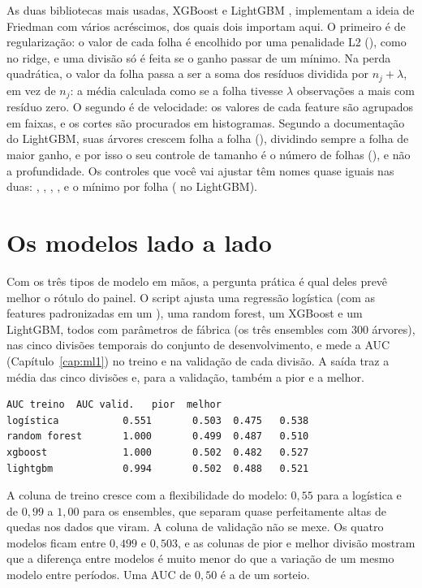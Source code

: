 As duas bibliotecas mais usadas, XGBoost \citep{chen2016} e LightGBM \citep{ke2017}, implementam a ideia de Friedman com vários acréscimos, dos quais dois importam aqui. O primeiro é de regularização: o valor de cada folha é encolhido por uma penalidade L2 (), como no ridge, e uma divisão só é feita se o ganho passar de um mínimo. Na perda quadrática, o valor da folha passa a ser a soma dos resíduos dividida por $n_j + \lambda$, em vez de $n_j$: a média calculada como se a folha tivesse $\lambda$ observações a mais com resíduo zero. O segundo é de velocidade: os valores de cada feature são agrupados em faixas, e os cortes são procurados em histogramas. Segundo a documentação do LightGBM, suas árvores crescem folha a folha (), dividindo sempre a folha de maior ganho, e por isso o seu controle de tamanho é o número de folhas (), e não a profundidade. Os controles que você vai ajustar têm nomes quase iguais nas duas: , , , ,  e o mínimo por folha ( no LightGBM).

\section{Os modelos lado a lado}
\label{sec:c13-comparacao}

Com os três tipos de modelo em mãos, a pergunta prática é qual deles prevê melhor o rótulo do painel. O script  ajusta uma regressão logística (com as features padronizadas em um ), uma random forest, um XGBoost e um LightGBM, todos com parâmetros de fábrica (os três ensembles com 300 árvores), nas cinco divisões temporais do conjunto de desenvolvimento, e mede a AUC (Capítulo~\ref{cap:ml1}) no treino e na validação de cada divisão. A saída traz a média das cinco divisões e, para a validação, também a pior e a melhor.

\begin{lstlisting}[style=saida]
               AUC treino  AUC valid.   pior  melhor
logística           0.551       0.503  0.475   0.538
random forest       1.000       0.499  0.487   0.510
xgboost             1.000       0.502  0.482   0.527
lightgbm            0.994       0.502  0.488   0.521
\end{lstlisting}

A coluna de treino cresce com a flexibilidade do modelo: $0,55$ para a logística e de $0,99$ a $1,00$ para os ensembles, que separam quase perfeitamente altas de quedas nos dados que viram. A coluna de validação não se mexe. Os quatro modelos ficam entre $0,499$ e $0,503$, e as colunas de pior e melhor divisão mostram que a diferença entre modelos é muito menor do que a variação de um mesmo modelo entre períodos. Uma AUC de $0,50$ é a de um sorteio.


